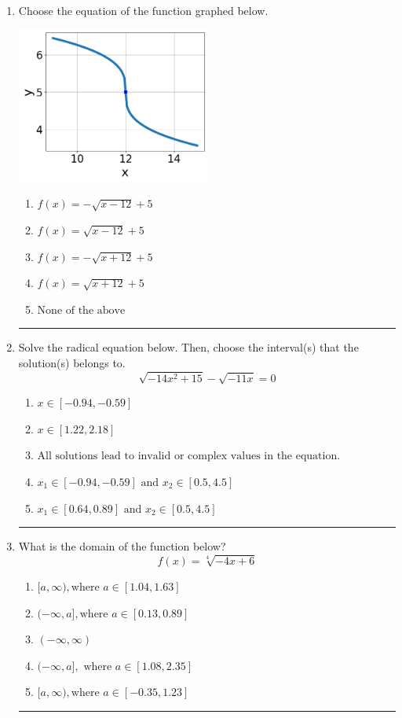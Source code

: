 \documentclass[14pt]{extbook}
\newcommand{\litem}[1]{\item#1\hspace*{-1cm}\rule{\textwidth}{0.4pt}}
\begin{document}
\begin{enumerate}
\litem{
Choose the equation of the function graphed below.
\begin{center}
    \includegraphics[width=0.5\textwidth]{../Figures/radicalGraphToEquationB.png}
\end{center}
\begin{enumerate}[label=\Alph*.]
\item \( f(x) = - \sqrt{x - 12} + 5 \)
\item \( f(x) = \sqrt{x - 12} + 5 \)
\item \( f(x) = - \sqrt{x + 12} + 5 \)
\item \( f(x) = \sqrt{x + 12} + 5 \)
\item \( \text{None of the above} \)

\end{enumerate} }
\litem{
Solve the radical equation below. Then, choose the interval(s) that the solution(s) belongs to.\[ \sqrt{-14 x^2 + 15} - \sqrt{-11 x} = 0 \]\begin{enumerate}[label=\Alph*.]
\item \( x \in [-0.94,-0.59] \)
\item \( x \in [1.22,2.18] \)
\item \( \text{All solutions lead to invalid or complex values in the equation.} \)
\item \( x_1 \in [-0.94, -0.59] \text{ and } x_2 \in [0.5,4.5] \)
\item \( x_1 \in [0.64, 0.89] \text{ and } x_2 \in [0.5,4.5] \)

\end{enumerate} }
\litem{
What is the domain of the function below?\[ f(x) = \sqrt[4]{-4 x + 6} \]\begin{enumerate}[label=\Alph*.]
\item \( [a, \infty), \text{where } a \in [1.04, 1.63] \)
\item \( (-\infty, a], \text{where } a \in [0.13, 0.89] \)
\item \( (-\infty, \infty) \)
\item \( (-\infty, a], \text{ where } a \in [1.08, 2.35] \)
\item \( [a, \infty), \text{where } a \in [-0.35, 1.23] \)


\end{enumerate}}
\end{enumerate}
\end{document}
